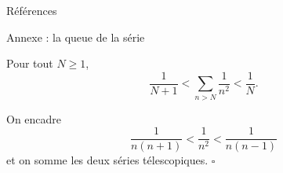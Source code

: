 \documentclass[nuit,charter,pied]{BeamerJS}
\begin{document}
\begin{frame}{Références}
	\printbibliography
\end{frame}

\debutannexe

\begin{frame}{Annexe : la queue de la série}
	\begin{prop}
		Pour tout $N\geq1$,
		\[
			\frac{1}{N+1}<\sum_{n>N}\frac{1}{n^2}<\frac{1}{N}.
		\]
	\end{prop}
	\begin{preuve}
		On encadre
		\[
			\frac{1}{n(n+1)}<\frac{1}{n^2}<\frac{1}{n(n-1)}
		\]
		et on somme les deux séries télescopiques. \hfill$\square$
	\end{preuve}
\end{frame}

\finannexe
\end{document}
